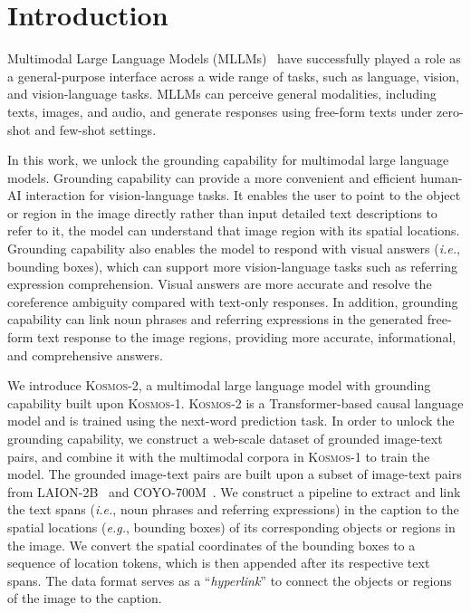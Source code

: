 \documentclass{article}
\newcommand\kosmos{\textsc{Kosmos-1}}
\newcommand\our{\textsc{Kosmos-2}}
\newcommand\ie{\textit{i.e.}}
\newcommand\eg{\textit{e.g.}}
\begin{document}
\newpage

\section{Introduction}
\label{sec:intro}

Multimodal Large Language Models (MLLMs)~\cite{metalm,flamingo,kosmos-1,palm_e,gpt4} have successfully played a role as a general-purpose interface across a wide range of tasks, such as language, vision, and vision-language tasks.
MLLMs can perceive general modalities, including texts, images, and audio, and generate responses using free-form texts under zero-shot and few-shot settings.

In this work, we unlock the grounding capability for multimodal large language models.
Grounding capability can provide a more convenient and efficient human-AI interaction for vision-language tasks.
It enables the user to point to the object or region in the image directly rather than input detailed text descriptions to refer to it, the model can understand that image region with its spatial locations.
Grounding capability also enables the model to respond with visual answers (\ie, bounding boxes), which can support more vision-language tasks such as referring expression comprehension. 
Visual answers are more accurate and resolve the coreference ambiguity compared with text-only responses.
In addition, grounding capability can link noun phrases and referring expressions in the generated free-form text response to the image regions, providing more accurate, informational, and comprehensive answers.

We introduce \our{}, a multimodal large language model with grounding capability built upon \kosmos{}.
\our{} is a Transformer-based causal language model and is trained using the next-word prediction task.
In order to unlock the grounding capability, we construct a web-scale dataset of grounded image-text pairs, and combine it with the multimodal corpora in \kosmos{} to train the model.
The grounded image-text pairs are built upon a subset of image-text pairs from LAION-2B~\cite{laion5b} and COYO-700M~\cite{coyo700m}.
We construct a pipeline to extract and link the text spans (\ie, noun phrases and referring expressions) in the caption to the spatial locations (\eg, bounding boxes) of its corresponding objects or regions in the image.
We convert the spatial coordinates of the bounding boxes to a sequence of location tokens, which is then appended after its respective text spans.
The data format serves as a ``\textit{hyperlink}'' to connect the objects or regions of the image to the caption.
\end{document}
